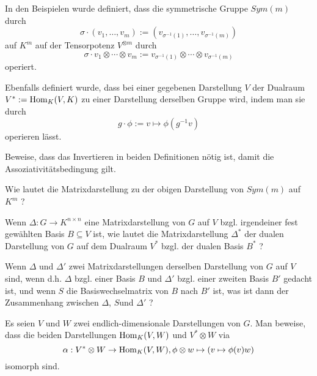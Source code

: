 \begin{sheet}

\begin{problem}[title={Komische Minus Einsen}, difficulty=leicht]\label{ex:invertieren_fuer_linksmoduln}
\begin{subproblem}
In den Beispielen wurde definiert, dass die symmetrische Gruppe $Sym(m)$ durch
\[\sigma \cdot (v_1,\ldots,v_m) := (v_{\sigma^{-1}(1)}, \ldots, v_{\sigma^{-1}(m)})\]
auf $K^m$ auf der Tensorpotenz $V^{\otimes m}$ durch
\[\sigma \cdot v_1\otimes\cdots\otimes v_m := v_{\sigma^{-1}(1)}\otimes \cdots \otimes v_{\sigma^{-1}(m)} \]
operiert.
\end{subproblem}
\begin{subproblem}
Ebenfalls definiert wurde, dass bei einer gegebenen Darstellung $V$ der Dualraum $V^\ast := \operatorname{Hom}_K(V,K)$ zu einer Darstellung derselben Gruppe wird, indem man sie durch
\[g\cdot \phi := v\mapsto \phi(g^{-1}v)\]
operieren lässt.
\end{subproblem}

Beweise, dass das Invertieren in beiden Definitionen nötig ist, damit die Assoziativitätsbedingung gilt.
\end{problem}

\begin{problem}
Wie lautet die Matrixdarstellung zu der obigen Darstellung von $Sym(m)$ auf $K^m$ ?
\end{problem}

\begin{problem}
Wenn $\Delta: G\to K^{n\times n}$ eine Matrixdarstellung von $G$ auf $V$ bzgl. irgendeiner fest gewählten Basis $B\subseteq V$ ist, wie lautet die Matrixdarstellung $\Delta^\ast$ der dualen Darstellung von $G$ auf dem Dualraum $V^\ast$ bzgl. der dualen Basis $B^\ast$ ?
\end{problem}

\begin{problem}[title={Basiswechsel}]
Wenn $\Delta$ und $\Delta'$ zwei Matrixdarstellungen derselben Darstellung von $G$ auf $V$ sind, wenn d.h. $\Delta$ bzgl. einer Basis $B$ und $\Delta'$ bzgl. einer zweiten Basis $B'$ gedacht ist, und wenn $S$ die Basiswechselmatrix von $B$ nach $B'$ ist, was ist dann der Zusammenhang zwischen $\Delta$, $S$und $\Delta'$ ?
\end{problem}

\begin{problem}\label{ex:hom_tensor_isomorphismus}
\begin{subproblem}
Es seien $V$ und $W$ zwei endlich-dimensionale Darstellungen von $G$. Man beweise, dass die beiden Darstellungen $\operatorname{Hom}_K(V,W)$ und $V^\ast \otimes W$ via
\[\alpha: V^\ast \otimes W \to \operatorname{Hom}_K(V,W), \phi \otimes w \mapsto (v\mapsto \phi(v)w)\]
isomorph sind.
\end{subproblem}


\end{problem}
\end{sheet}
